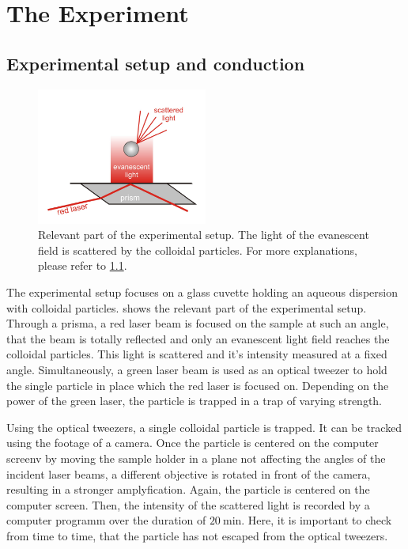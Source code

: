 \documentclass[../bericht.tex]{subfiles}
\begin{document}
  \chapter{The Experiment}

    \section{Experimental setup and conduction}
    \label{sec:exp-setup}

      \begin{figure}[bt]
        \centering
        \includegraphics[width=0.5\textwidth]{figures/eyp_setup.png}
        \caption{Relevant part of the experimental setup. The light of the evanescent field is scattered by the colloidal particles. For more explanations, please refer to \cref{sec:exp-setup}.}
        \label{fig:exp-setup}
      \end{figure}

      The experimental setup focuses on a glass cuvette holding an aqueous dispersion with colloidal particles.  shows the relevant part of the experimental setup. Through a prisma, a red laser beam is focused on the sample at such an angle, that the beam is totally reflected and only an evanescent light field reaches the colloidal particles. This light is scattered and it's intensity measured at a fixed angle. Simultaneously, a green laser beam is used as an optical tweezer to hold the single particle in place which the red laser is focused on. Depending on the power of the green laser, the particle is trapped in a trap of varying strength.
      \medskip

      Using the optical tweezers, a single colloidal particle is trapped. It can be tracked using the footage of a camera. Once the particle is centered on the computer screenv by moving the sample holder in a plane not affecting the angles of the incident laser beams, a different objective is rotated in front of the camera, resulting in a stronger amplyfication. Again, the particle is centered on the computer screen. Then, the intensity of the scattered light is recorded by a computer programm over the duration of $\SI{20}{\minute}$. Here, it is important to check from time to time, that the particle has not escaped from the optical tweezers.
\end{document}
